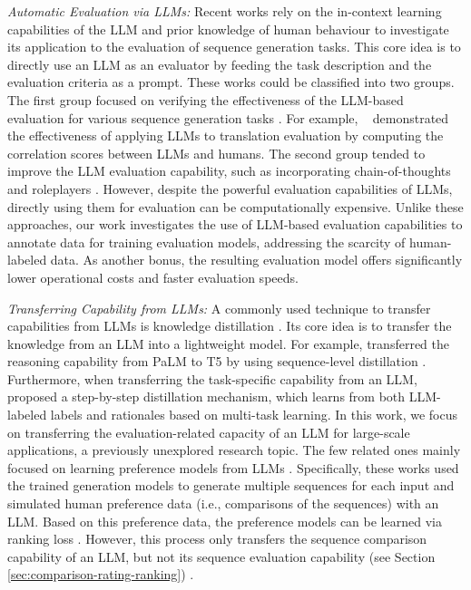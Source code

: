 \documentclass[lettersize,journal]{IEEEtran}
\begin{document}
\textit{Automatic Evaluation via LLMs:}
Recent works rely on the in-context learning capabilities of the LLM and prior knowledge of human behaviour to investigate its application to the evaluation of sequence generation tasks. This core idea is to directly use an LLM as an evaluator by feeding the task description and the evaluation criteria as a prompt. These works could be classified into two groups. The first group focused on verifying the effectiveness of the LLM-based evaluation for various sequence generation tasks \cite{fu2023gptscore, kocmi2023large, wang2023chatgpt, lai2023multidimensional}. For example, \ \cite{kocmi2023large} demonstrated the effectiveness of applying LLMs to translation evaluation by computing the correlation scores between LLMs and humans. The second group tended to improve the LLM evaluation capability, such as incorporating chain-of-thoughts \cite{liu2023gpteval, luo2023chatgpt} and roleplayers \cite{wu2023large,chan2023chateval}. However, despite the powerful evaluation capabilities of LLMs, directly using them for evaluation can be computationally expensive. Unlike these approaches, our work investigates the use of LLM-based evaluation capabilities to annotate data for training evaluation models, addressing the scarcity of human-labeled data. As another bonus, the resulting evaluation model offers significantly lower operational costs and faster evaluation speeds.

\textit{Transferring Capability from LLMs:}
A commonly used technique to transfer capabilities from LLMs is knowledge distillation \cite{lin2020weight,tripathi2023divide,wang2023improved}. Its core idea is to transfer the knowledge from an LLM into a lightweight model. For example, \cite{ho2022large} transferred the reasoning capability from PaLM \cite{chowdhery2022palm} to T5 \cite{raffel2020exploring} by using sequence-level distillation \cite{kim2016sequence}. Furthermore, when transferring the task-specific capability from an LLM, \cite{hsieh2023distilling} proposed a step-by-step distillation mechanism, which learns from both LLM-labeled labels and rationales based on multi-task learning. In this work, we focus on transferring the evaluation-related capacity of an LLM for large-scale applications, a previously unexplored research topic. The few related ones mainly focused on learning preference models from LLMs \cite{lee2023rlaif, cui2023ultrafeedback}. Specifically, these works used the trained generation models to generate multiple sequences for each input and simulated human preference data (i.e., comparisons of the sequences) with an LLM. Based on this preference data, the preference models can be learned via ranking loss \cite{ouyang2022training}. However, this process only transfers the sequence comparison capability of an LLM, but not its sequence evaluation capability (see Section \ref{sec:comparison-rating-ranking}) \cite{ziya-reward-7B}.
\end{document}
